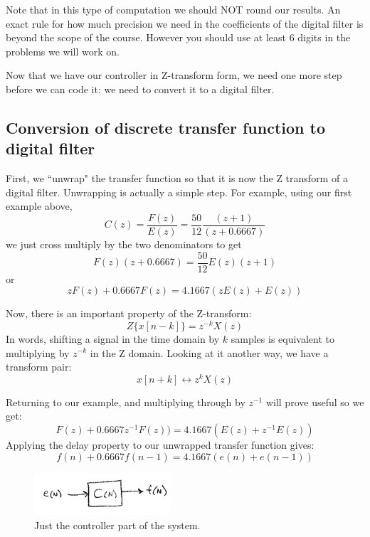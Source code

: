 
Note that in this type of computation we should NOT round our results.  An exact rule for how much precision we need in the coefficients of the digital filter is beyond the scope of the course.  However you should use at least 6 digits in the problems we will work on.



Now that we have our controller in Z-transform form, we need one more step before we can code it: we need to convert it to a digital filter.

\subsection{Conversion of discrete transfer function to digital filter}

First, we ``unwrap" the transfer function so that it is now the Z transform of a digital filter.  Unwrapping is actually a simple step.  For example, using our first example above, 
\[
C(z) = \frac{F(z)}{E(z)} = \frac{50}{12}\frac{(z+1)}{(z+0.6667)}
\]
we just cross multiply by the two denominators to get
\[
F(z) (z+0.6667) = \frac{50}{12} E(z) (z+1)
\]
or
\[
zF(z)+0.6667F(z) = 4.1667 (z E(z) + E(z))
\]


Now, there is an important property of the Z-transform:	%
\[
Z\{x[n-k]\} = z^{-k}X(z)
\]
 In  words, shifting a signal in the time domain by $k$ samples is equivalent to multiplying by $z^{-k}$ in the Z domain.   Looking at it another way, we have a transform pair:	%
\[
x[n+k] \leftrightarrow z^{k}X(z)
\]

Returning to our example, and	%
multiplying through by $z^{-1}$ will prove useful so we get:
\[
F(z)+0.6667z^{-1}F(z)) = 4.1667 ( E(z) + z^{-1}E(z))
\]
Applying the delay property  to our unwrapped transfer function  gives:	%
\[
f(n)+0.6667f(n-1) = 4.1667 (e(n) + e(n-1))
\]

\begin{figure}\centering
\includegraphics[width=2.0in]{figs11/dt_ctlra.png}
\caption{Just the controller part of the system.}\label{F:dt_ctl}
\end{figure}

